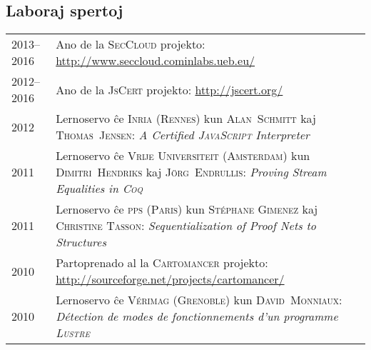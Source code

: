 \documentclass[12pt,a4paper]{article}
\makeatletter
\newcommand{\en}[1]{\foreignlanguage{english}{\textit{#1}}}
\newenvironment{datecvsection}[1]%
               {\subsection*{#1}%
                 \noindent \begin{tabular}{@{}p{\annee}p{\texte}@{}}}
               {\end{tabular}}
\makeatother
\begin{document}
\begin{datecvsection}{Laboraj spertoj}

	2013–2016 & Ano de la \textsc{SecCloud} projekto:  \url{http://www.seccloud.cominlabs.ueb.eu/} \\

	2012–2016 & Ano de la \textsc{JsCert} projekto:  \url{http://jscert.org/} \\

	2012 & Lernoservo ĉe \textsc{Inria} (\textsc{Rennes}) kun \textsc{Alan~Schmitt} kaj \textsc{Thomas~Jensen}:
	\en{\textit{A Certified \textsc{JavaScript} Interpreter}} \\

	2011 & Lernoservo ĉe \textsc{Vrĳe Universiteit} (\textsc{Amsterdam}) kun \textsc{Dimitri~Hendriks} kaj \textsc{Jörg~Endrullis}:
	\en{\textit{Proving Stream Equalities in \textsc{Coq}}} \\

	2011 & Lernoservo ĉe \textsc{pps} (\textsc{Paris}) kun \textsc{Stéphane Gimenez} kaj \textsc{Christine Tasson}:
	\en{\textit{Sequentialization of Proof Nets to Structures}} \\

	2010 & Partoprenado al la \textsc{Cartomancer} projekto:  \url{http://sourceforge.net/projects/cartomancer/} \\

	2010 & Lernoservo ĉe \textsc{Vérimag} (\textsc{Grenoble}) kun \textsc{David~Monniaux}:
	\textit{Détection de modes de fonctionnements d’un programme \textsc{Lustre}} \\

\end{datecvsection}
\end{document}
